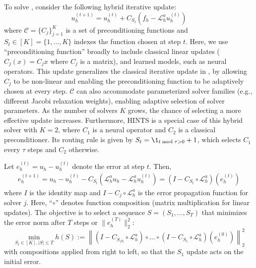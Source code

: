 \documentclass{article}
\begin{document}
To solve , consider the following hybrid iterative update:
\begin{equation}
     u^{\left(t + 1\right)}_h = u^{\left(t\right)}_h + C_{S_t}\left(f_h - \mathcal{L}_h^au^{\left(t \right)}_h\right)
\end{equation}
where $\mathcal{C} =\{C_{j}\}_{j = 1}^K$ is a set of preconditioning functions and $S_t \in [K] = \{1, \dots, K\}$ indexes the function chosen at step $t$. Here, we use ``preconditioning function'' broadly to include classical linear updates ($C_j(x) = C_jx$ where $C_j$ is a matrix), and learned models, such as neural operators. 
This update generalizes the classical iterative update in , by allowing $C_j$ to be non-linear and enabling the preconditioning function to be adaptively chosen at every step. $\mathcal{C}$ can also accommodate parameterized solver families (e.g., different Jacobi relaxation weights), enabling adaptive selection of solver parameters.  As the number of solvers $K$ grows, the chance of selecting a more effective update increases. Furthermore, HINTS \citep{zhang2024blending} is a special case of this hybrid solver with $K = 2$, where  $C_1$ is a neural operator and $C_2$ is a classical preconditioner. Its routing rule is given by $S_t = \1_{t \bmod \tau > 0} + 1$, which selects $C_1$ every $\tau$ steps and $C_2$ otherwise.

Let $e^{(t)}_h = u_h - u^{(t)}_h$ denote the error at step $t$. Then, 
\begin{align*}
    e^{(t + 1)}_h = u_h -  u^{(t)}_h -C_{S_t}\left(\mathcal{L}_h^au_h - \mathcal{L}_h^au^{\left(t\right)}_h\right) = \left(I- C_{S_t} \circ \mathcal{L}_h^a\right)(e^{(t)}_h)
\end{align*}
where $I$ is the identity map and $I - C_{j} \circ\mathcal{L}_h^a$ is the error propagation function for solver $j$. Here, ``$\circ$'' denotes function composition (matrix multiplication for linear updates).
The objective is to select a sequence $S = (S_1, \dots, S_T)$ that minimizes the error norm after $T$ steps or $\|e^{(T)}_h\|_2^2$:
\begin{equation} \label{eq:errorobjective}
    \min_{S_t \in [K], |S| \leq T} h(S) := \left\|\left(I - C_{S_{|S|}} \circ \mathcal{L}_h^a\right) \circ \dots \circ \left(I - C_{S_1} \circ \mathcal{L}_h^a\right)  \left(e^{(0)}_h \right)\right\|^2_2
\end{equation}
with compositions applied from right to left, so that the $S_1$ update acts on the initial error.
\end{document}
